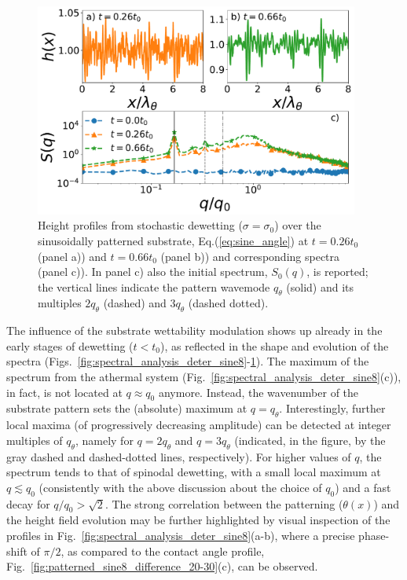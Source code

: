 \begin{figure}
    \centering
    \includegraphics[width=0.95\textwidth]{graphics/psd_spacedepCA_sine_25_10_1e-7_[0, 450000, 1150000]_9_3_rescaled.pdf}
    \caption{Height profiles from stochastic dewetting ($\sigma=\sigma_0$) 
    over the sinusoidally patterned substrate, Eq.(\ref{eq:sine_angle}) at $t=0.26 t_0$ (panel a)) and $t=0.66 t_0$ (panel b))  
    and corresponding spectra (panel c)).  
    In panel c) also the initial spectrum, $S_0(q)$, is reported; the vertical lines indicate the pattern wavemode $q_{\theta}$ (solid) and its multiples $2q_{\theta}$ (dashed) and $3q_{\theta}$ (dashed dotted).}
    \label{fig:spectral_analysis_stoch_sine8}
\end{figure}
The influence of the substrate wettability modulation shows up already in the early stages of dewetting ($t<t_0$), as reflected in the shape and evolution of the spectra (Figs.~\ref{fig:spectral_analysis_deter_sine8}-\ref{fig:spectral_analysis_stoch_sine8}). 
The maximum of the spectrum from the athermal system (Fig.~\ref{fig:spectral_analysis_deter_sine8}(c)), in fact, is not located at $q \approx q_0$ anymore.
Instead, the wavenumber of the substrate pattern sets the (absolute) maximum at $q=q_{\theta}$. 
Interestingly, further local maxima (of progressively decreasing amplitude) can be detected at integer multiples of $q_{\theta}$, namely for $q=2q_{\theta}$ and $q=3q_{\theta}$ (indicated, in the figure, by the gray dashed and dashed-dotted lines, respectively).
For higher values of $q$, the spectrum tends to that of spinodal dewetting, with a small local maximum at $q \lesssim q_0$ (consistently with the above discussion about the choice of $q_0$) and a fast decay for $q/q_0 > \sqrt{2}$.
The strong correlation between the patterning ($\theta(x)$) and the height field evolution may be further highlighted by visual inspection of the profiles in Fig.~\ref{fig:spectral_analysis_deter_sine8}(a-b), where a precise phase-shift of $\pi/2$, as compared to the contact angle profile, Fig.~\ref{fig:patterned_sine8_difference_20-30}(c), can be observed. 
